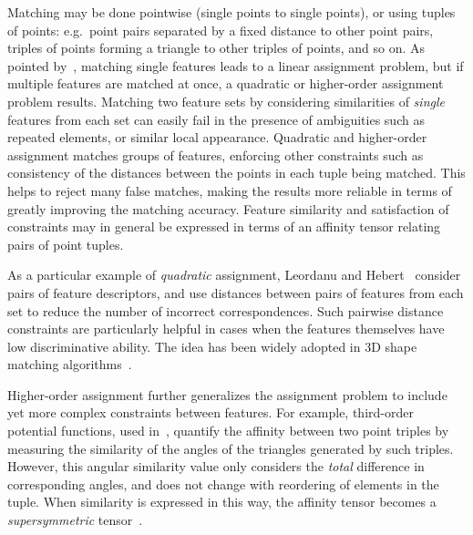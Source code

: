 Matching may be done pointwise (single points to single points), or using tuples of points:
e.g.\ point pairs separated by a fixed distance to other point pairs,
triples of points forming a triangle to other triples of points, and so on.
As pointed by~\cite{Conte04}, matching single features leads to
a linear assignment problem, but if multiple features are matched at once,
a quadratic or higher-order assignment problem results.
Matching two feature sets by considering similarities of \emph{single} features from each set can easily fail in the presence of ambiguities such as repeated elements,
or similar local appearance.
Quadratic and higher-order assignment matches groups of features,
enforcing other constraints such as consistency of the distances between the points in each tuple being matched.
This helps to reject many false matches, making the results more reliable in terms of greatly improving the matching accuracy.
Feature similarity and satisfaction of constraints may in general be expressed in terms of an affinity tensor relating pairs of point tuples.

As a particular example of \emph{quadratic} assignment, Leordanu and Hebert~\cite{Leordeanu05} consider pairs of feature descriptors,
and use distances between pairs of features from each set to reduce the number of incorrect correspondences.
Such pairwise distance constraints are particularly helpful in cases when the features themselves have low discriminative ability.
The idea has been widely adopted in 3D shape matching algorithms~\cite{Tevs09,Ovsjanikov10,Tevs11,Kim11,SahilliogluY11,Windheuser11}.

Higher-order assignment further generalizes the assignment problem to include yet more complex constraints between features.
For example, third-order potential functions, used in~\cite{Duchenne09,Zeng10,Chertok10},
quantify the affinity between two point triples by measuring the similarity of the angles of the triangles generated by such triples.
However, this angular similarity value only considers the \emph{total} difference in corresponding angles, and does not change with reordering of elements in the tuple.
When similarity is expressed in this way, the affinity tensor becomes a \emph{supersymmetric} tensor~\cite{Kofidis02}.

